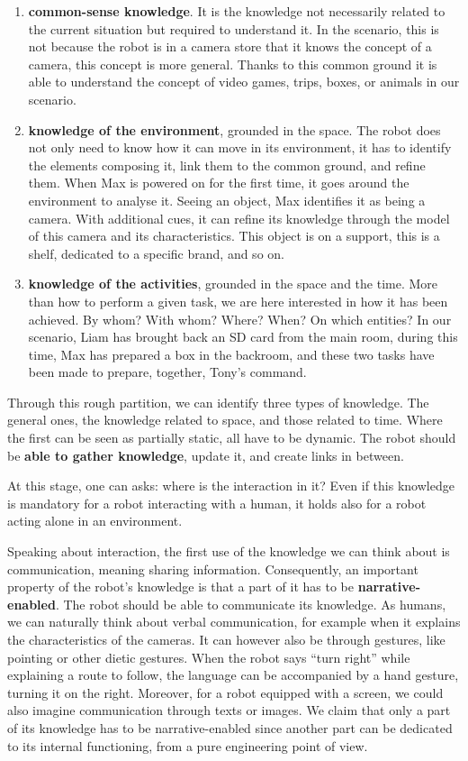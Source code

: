 \begin{enumerate}
  \item \textbf{common-sense knowledge}. It is the knowledge not necessarily related to the current situation but required to understand it. In the scenario, this is not because the robot is in a camera store that it knows the concept of a camera, this concept is more general. Thanks to this common ground it is able to understand the concept of video games, trips, boxes, or animals in our scenario.
  \item \textbf{knowledge of the environment}, grounded in the space. The robot does not only need to know how it can move in its environment, it has to identify the elements composing it, link them to the common ground, and refine them. When Max is powered on for the first time, it goes around the environment to analyse it. Seeing an object, Max identifies it as being a camera. With additional cues, it can refine its knowledge through the model of this camera and its characteristics. This object is on a support, this is a shelf, dedicated to a specific brand, and so on.
  \item \textbf{knowledge of the activities}, grounded in the space and the time. More than how to perform a given task, we are here interested in how it has been achieved. By whom? With whom? Where? When? On which entities? In our scenario, Liam has brought back an SD card from the main room, during this time, Max has prepared a box in the backroom, and these two tasks have been made to prepare, together, Tony's command.
\end{enumerate}

Through this rough partition, we can identify three types of knowledge. The general ones, the knowledge related to space, and those related to time. Where the first can be seen as partially static, all have to be dynamic. The robot should be \textbf{able to gather knowledge}, update it, and create links in between.

At this stage, one can asks: where is the interaction in it? Even if this knowledge is mandatory for a robot interacting with a human, it holds also for a robot acting alone in an environment.

Speaking about interaction, the first use of the knowledge we can think about is communication, meaning sharing information. Consequently, an important property of the robot's knowledge is that a part of it has to be \textbf{narrative-enabled}. The robot should be able to communicate its knowledge. As humans, we can naturally think about verbal communication, for example when it explains the characteristics of the cameras. It can however also be through gestures, like pointing or other dietic gestures. When the robot says ``turn right'' while explaining a route to follow, the language can be accompanied by a hand gesture, turning it on the right. Moreover, for a robot equipped with a screen, we could also imagine communication through texts or images. We claim that only a part of its knowledge has to be narrative-enabled since another part can be dedicated to its internal functioning, from a pure engineering point of view.

